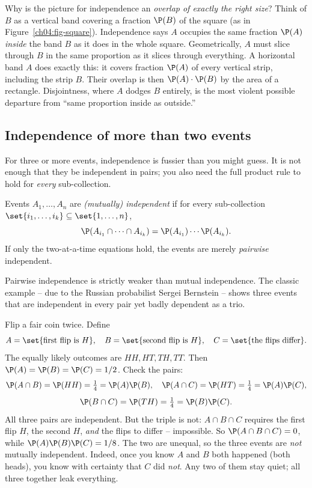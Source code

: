 \begin{whybox}
Why is the picture for independence an \emph{overlap of exactly the right size}? Think of $B$ as a vertical band covering a fraction $\P(B)$ of the square (as in Figure~\ref{ch04:fig-square}). Independence says $A$ occupies the same fraction $\P(A)$ \emph{inside} the band $B$ as it does in the whole square. Geometrically, $A$ must slice through $B$ in the same proportion as it slices through everything. A horizontal band $A$ does exactly this: it covers fraction $\P(A)$ of every vertical strip, including the strip $B$. Their overlap is then $\P(A)\cdot\P(B)$ by the area of a rectangle. Disjointness, where $A$ dodges $B$ entirely, is the most violent possible departure from ``same proportion inside as outside.''
\end{whybox}

\subsection{Independence of more than two events}

For three or more events, independence is fussier than you might guess. It is not enough that they be independent in pairs; you also need the full product rule to hold for \emph{every} sub-collection.

\begin{definition}
\label{ch04:def-mutual-indep}
Events $A_1, \dots, A_n$ are \emph{(mutually) independent} if for every sub-collection $\set{i_1, \dots, i_k} \subseteq \set{1,\dots,n}$,
\[
\P(A_{i_1} \cap \cdots \cap A_{i_k}) = \P(A_{i_1})\cdots\P(A_{i_k}).
\]
If only the two-at-a-time equations hold, the events are merely \emph{pairwise} independent.
\end{definition}

Pairwise independence is strictly weaker than mutual independence. The classic example -- due to the Russian probabilist Sergei Bernstein -- shows three events that are independent in every pair yet badly dependent as a trio.

\begin{example}
\label{ch04:ex-bernstein}
Flip a fair coin twice. Define
\[
A = \set{\text{first flip is }H}, \quad B = \set{\text{second flip is }H}, \quad C = \set{\text{the flips differ}}.
\]
The equally likely outcomes are $HH, HT, TH, TT$. Then $\P(A)=\P(B)=\P(C)=1/2$. Check the pairs:
\[
\P(A\cap B) = \P(HH) = \tfrac14 = \P(A)\P(B), \quad
\P(A\cap C) = \P(HT) = \tfrac14 = \P(A)\P(C),
\]
\[
\P(B\cap C) = \P(TH) = \tfrac14 = \P(B)\P(C).
\]
All three pairs are independent. But the triple is not: $A\cap B\cap C$ requires the first flip $H$, the second $H$, \emph{and} the flips to differ -- impossible. So $\P(A\cap B\cap C) = 0$, while $\P(A)\P(B)\P(C) = 1/8$. The two are unequal, so the three events are \emph{not} mutually independent. Indeed, once you know $A$ and $B$ both happened (both heads), you know with certainty that $C$ did \emph{not}. Any two of them stay quiet; all three together leak everything.
\end{example}

